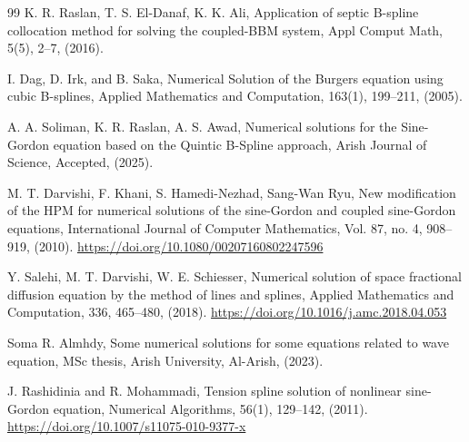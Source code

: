 \documentclass[10pt,letterpaper,twoside]{article}
\begin{document}
\begin{thebibliography}{99}
 K. R. Raslan, T. S. El-Danaf, K. K. Ali, Application of septic B-spline collocation method for solving the coupled-BBM system, Appl Comput Math, 5(5), 2--7, (2016).

 I. Dag, D. Irk, and B. Saka, Numerical Solution of the Burgers equation using cubic B-splines, Applied Mathematics and Computation, 163(1), 199--211, (2005).

 A. A. Soliman, K. R. Raslan, A. S. Awad, Numerical solutions for the Sine-Gordon equation based on the Quintic B-Spline approach, Arish Journal of Science, Accepted, (2025).

 M. T. Darvishi, F. Khani, S. Hamedi-Nezhad, Sang-Wan Ryu, New modification of the HPM for numerical solutions of the sine-Gordon and coupled sine-Gordon equations, International Journal of Computer Mathematics, Vol. 87, no. 4, 908--919, (2010). \href{https://doi.org/10.1080/00207160802247596}{https://doi.org/10.1080/00207160802247596}

 Y. Salehi, M. T. Darvishi, W. E. Schiesser, Numerical solution of space fractional diffusion equation by the method of lines and splines, Applied Mathematics and Computation, 336, 465--480, (2018). \href{https://doi.org/10.1016/j.amc.2018.04.053}{https://doi.org/10.1016/j.amc.2018.04.053}

 Soma R. Almhdy, Some numerical solutions for some equations related to wave equation, MSc thesis, Arish University, Al-Arish, (2023).

 J. Rashidinia and R. Mohammadi, Tension spline solution of nonlinear sine-Gordon equation, Numerical Algorithms, 56(1), 129--142, (2011). \href{https://doi.org/10.1007/s11075-010-9377-x}{https://doi.org/10.1007/s11075-010-9377-x}


\end{thebibliography}
\end{document}
